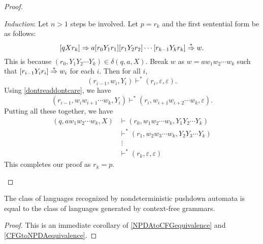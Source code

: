 \begin{proof}
\begin{itemize}
        \vspace{1mm}
        \textit{Induction}: Let $n>1$ steps be involved. Let $p=r_k$ and the first sentential form be as follows:
        $$[qXr_k]\Rightarrow a[r_0Y_1r_1][r_1Y_2r_2]\cdots[r_{k-1}Y_kr_k]\overset{*}{\Rightarrow} w.$$
        This is because $(r_0,Y_1Y_2\cdots Y_k)\in\delta(q,a,X)$. Break $w$ as $w=aw_1w_2\cdots w_k$ such that $[r_{i-1}Y_ir_i]\overset{*}{\Rightarrow} w_i$ for each $i$. Then for all $i$,
        $$(r_{i-1}, w_i, Y_i)\vdash^* (r_i,\varepsilon,\varepsilon).$$
        Using \ref{dontreaddontcare}, we have
        $$(r_{i-1}, w_iw_{i+1}\cdots w_k, Y_i)\vdash^* (r_i,w_{i+1}w_{i+2}\cdots w_k,\varepsilon).$$
        Putting all these together, we have
        \begin{align*}
            (q,aw_1w_2\cdots w_k, X)&\vdash (r_0, w_1w_2\cdots w_k, Y_1Y_2\cdots Y_k) \\
            &\vdash^* (r_1, w_2w_3\cdots w_k, Y_2Y_3\cdots Y_k) \\
            &\; \vdots \\
            &\vdash^* (r_k,\varepsilon,\varepsilon)
        \end{align*}
        This completes our proof as $r_k=p$.
    \end{itemize}
\end{proof}

\begin{theorem}
    The class of languages recognized by nondeterministic pushdown automata is equal to the class of languages generated by context-free grammars.
\end{theorem}
\begin{proof}
    This is an immediate corollary of \ref{NPDAtoCFGequivalence} and \ref{CFGtoNPDAequivalence}.
\end{proof}